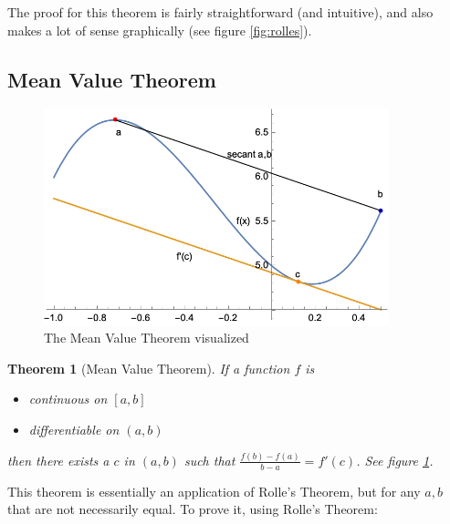\documentclass[12pt]{article}
\newtheorem*{theorem}{Theorem}
\begin{document}
The proof for this theorem is fairly straightforward (and intuitive), and also makes a lot of sense graphically (see figure \ref{fig:rolles}).

\subsection{Mean Value Theorem}
\begin{figure}[!ht]
    \centering
    \includegraphics[width=10cm]{misc/mvt.png}
    \caption{The Mean Value Theorem visualized}
    \label{fig:mvt}
\end{figure}
\begin{theorem}[Mean Value Theorem]
    If a function $f$ is
    \begin{itemize}
        \item \textit{continuous} on $[a,b]$
        \item \textit{differentiable} on $(a,b)$
    \end{itemize}
    then there exists a $c$ in $(a,b)$ such that $\frac{f(b)-f(a)}{b-a} = f'(c)$. See figure \ref{fig:mvt}.
\end{theorem}

This theorem is essentially an application of Rolle's Theorem, but for any $a,b$ that are not necessarily equal. To prove it, using Rolle's Theorem:
\end{document}
